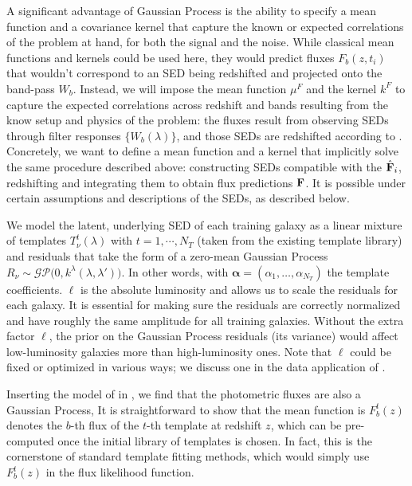 \documentclass[aps,prd,showpacs,superscriptaddress,groupedaddress]{revtex4}  %
\begin{document}
A significant advantage of Gaussian Process is the ability to specify a mean function and a covariance kernel that capture the known or expected correlations of the problem at hand, for both the signal and the noise.
While classical mean functions and kernels could be used here, they would predict fluxes $F_b(z, t_i)$ that wouldn't correspond to an SED being redshifted and projected onto the band-pass $W_b$.
Instead, we will impose the mean function $\mu^F$ and the kernel $k^F$ to capture the expected correlations across redshift and bands resulting from the know setup and physics of the problem: the fluxes result from observing SEDs through filter responses $\{ W_b(\lambda)\}$, and those SEDs are redshifted according to .  
Concretely, we want to define a mean function and a kernel that implicitly solve the same procedure described above: constructing SEDs compatible with the $\hat{\mat{F}}_i$, redshifting and integrating them to obtain flux predictions $\mat{F}$. 
It is possible under certain assumptions and descriptions of the SEDs, as described below.

We model the latent, underlying SED of each training galaxy as a linear mixture of templates $T^t_\nu(\lambda)$  with $t=1, \cdots, N_T$ (taken from the existing template library) and residuals that take the form of a zero-mean Gaussian Process $R_\nu \sim \mathcal{GP}\bigl(0, k^\lambda(\lambda,\lambda') \bigr)$. In other words,
with $\bm{\alpha}=(\alpha_1, \dots, \alpha_{N_T})$ the template coefficients. 
$\ell$ is the absolute luminosity and allows us to scale the residuals for each galaxy. 
It is essential for making sure the residuals are correctly normalized and have roughly the same amplitude for all training galaxies. 
Without the extra factor $\ell$, the prior on the Gaussian Process residuals (\eg its variance) would affect low-luminosity galaxies more than high-luminosity ones.
Note that $\ell$ could be fixed or optimized in various ways; we discuss one in the data application of .

Inserting the model of  in , we find that the photometric fluxes are also a Gaussian Process,
It is straightforward to show that the mean function is
 $F^t_b(z)$ denotes the $b$-th flux of the $t$-th template at redshift $z$, which can be pre-computed once the initial library of templates is chosen. 
In fact, this is the cornerstone of standard template fitting methods, which would simply use $F^t_b(z)$ in the flux likelihood function.
\end{document}
